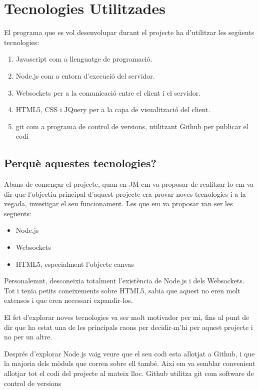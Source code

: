 \chapter{Tecnologies Utilitzades}
\label{sec:tecnologies}

El programa que es vol desenvolupar durant el projecte ha d'utilitzar les següents tecnologies: 

\begin{enumerate}
	\item{Javascript com a llenguatge de programació.}
	\item{Node.js com a entorn d'execució del servidor.}
	\item{Websockets per a la comunicació entre el client i el servidor.}
	\item{HTML5, CSS i JQuery per a la capa de visualització del client.}
	\item{git com a programa de control de versions, utilitzant Github per publicar el codi}
\end{enumerate}

\section{Perquè aquestes tecnologies?}

Abans de començar el projecte, quan en JM em va proposar de realitzar-lo em va dir que l'objectiu principal d'aquest projecte era provar noves tecnologies i a la vegada, investigar el seu funcionament. Les que em va proposar van ser les següents: 
\begin{itemize}
	\item{Node.js}
	\item{Websockets}
	\item{HTML5, especialment l'objecte canvas}
\end{itemize}

Personalemnt, desconeixia totalment l'existència de Node.js i dels Websockets. Tot i tenia petits coneixements sobre HTML5, sabia que aquest no eren molt extensos i que eren necessari expandir-los.

El fet d'explorar noves tecnologies va ser molt motivador per mi, fins al punt de dir que ha estat una de les principals raons per decidir-m'hi per aquest projecte i no per un altre.  

Després d'explorar Node.js vaig veure que el seu codi esta allotjat a Github, i que la majoria dels mòduls que corren sobre ell també. Així em va semblar convenient allotjar tot el codi del projecte al mateix lloc. Github utilitza git com software de control de versions


